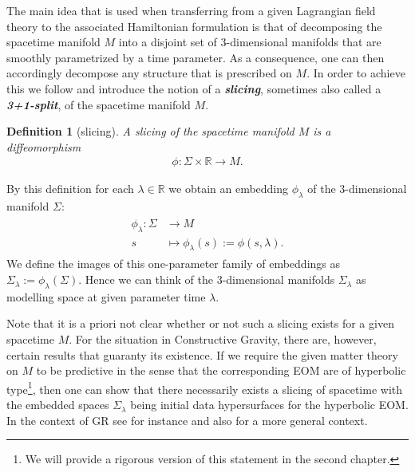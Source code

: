 \documentclass[a4paper,12pt, DIV=14, BCOR=5mm, twoside, headsepline, numbers=noenddot]{scrbook}
\newtheorem{definition}{Definition}[section]
\begin{document}
The main idea that is used when transferring from a given Lagrangian field theory to the associated Hamiltonian formulation is that of decomposing the spacetime manifold $M$ into a disjoint set of 3-dimensional manifolds that are smoothly parametrized by a time parameter. As a consequence, one can then accordingly decompose any structure that is prescribed on $M$. In order to achieve this we follow \cite{2004math.ph..11032G} and introduce the notion of a \textit{\textbf{slicing}}, sometimes also called a \textit{\textbf{3+1-split}}, of the spacetime manifold $M$.
\begin{definition}[slicing]
A slicing of the spacetime manifold $M$ is a diffeomorphism 
\begin{align}
\phi : \Sigma \times \mathbb{R} \longrightarrow M.
\end{align}
\end{definition}
By this definition for each $\lambda \in \mathbb{R}$ we obtain an embedding $\phi_{\lambda}$ of the 3-dimensional manifold $\Sigma$:
\begin{align}
\begin{aligned}
\phi_{\lambda}: \Sigma &\longrightarrow M \\
s &\longmapsto \phi_{\lambda}(s) := \phi(s,\lambda).
\end{aligned}
\end{align}
We define the images of this one-parameter family of embeddings as $\Sigma_{\lambda} := \phi_{\lambda}(\Sigma)$. Hence we can think of the 3-dimensional manifolds $\Sigma_{\lambda}$ as modelling space at given parameter time $\lambda$.

Note that it is a priori not clear whether or not such a slicing exists for a given spacetime $M$. For the situation in Constructive Gravity, there are, however, certain results that guaranty its existence. If we require the given matter theory on $M$ to be predictive in the sense that the corresponding EOM are of hyperbolic type\footnote{We will provide a rigorous version of this statement in the second chapter. }, then one can show that there necessarily exists a slicing of spacetime with the embedded spaces $\Sigma_{\lambda}$ being initial data hypersurfaces for the hyperbolic EOM. In the context of GR see for instance \cite{2003CMaPh.243..461B} and also \cite{1996gere.conf...19G} for a more general context. 
\end{document}
